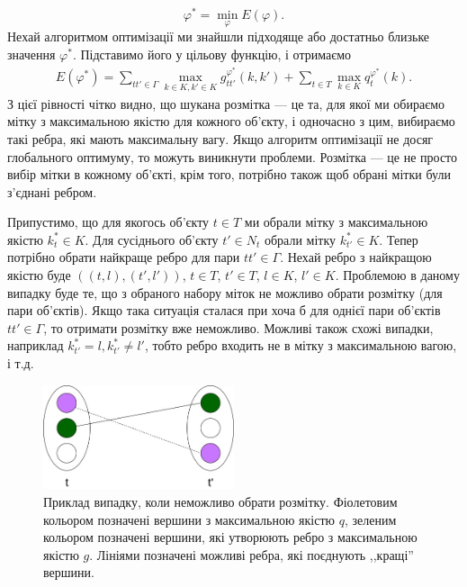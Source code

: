 \begin{equation*}
    \varphi^* = \min_{\varphi} E(\varphi).
\end{equation*}
Нехай алгоритмом оптимізації ми знайшли підходяще або достатньо близьке
значення $\varphi^*$. Підставимо його у цільову функцію, і отримаємо
\begin{equation*}
    \begin{aligned}
    E(\varphi^*) =
    \sum\limits_{tt'\in\Gamma}\max\limits_{k\in K, k'\in K}g^{\varphi^*}_{tt'}(k,k') + 
    \sum\limits_{t\in T}\max\limits_{k\in K}q^{\varphi^*}_t(k).
\end{aligned}
\end{equation*}
З цієї рівності чітко видно, що шукана розмітка --- це та, для якої ми обираємо мітку з
максимальною якістю для кожного об'єкту, і одночасно з цим, вибираємо такі ребра, які мають
максимальну вагу. Якщо алгоритм оптимізації не досяг глобального оптимуму, то 
можуть виникнути проблеми. Розмітка --- це не просто вибір мітки в кожному об'єкті, 
крім того, потрібно також щоб обрані мітки були з'єднані ребром. 

Припустимо, що
для якогось об'єкту $t\in T$ ми обрали мітку з максимальною якістю $k_t^*\in K$.
Для сусіднього об'єкту $t'\in N_t$ обрали мітку $k_{t'}^*\in K$. Тепер потрібно 
обрати найкраще ребро для пари $tt'\in\Gamma$. Нехай ребро з найкращою якістю
буде $((t,l),(t',l'))$, $t\in T$, $t'\in T$, $l\in K$, $l'\in K$. Проблемою в даному випадку
буде те, що з обраного набору міток не можливо обрати розмітку (для пари об'єктів).
Якщо така ситуація сталася при хоча б для однієї пари об'єктів $tt'\in\Gamma$, то 
отримати розмітку вже неможливо. Можливі також схожі випадки, наприклад 
$k_{t'}^*=l, k_{t'}^*\neq l'$, тобто ребро входить не в мітку з максимальною
вагою, і т.д.
\begin{figure}[h]
    \centering
    \includegraphics[width=0.5\textwidth]{images/multiple_choice.jpg}
    \caption{Приклад випадку, коли неможливо обрати розмітку. Фіолетовим кольором
    позначені вершини з максимальною якістю $q$, зеленим кольором позначені вершини, які
    утворюють ребро з максимальною якістю $g$. Лініями позначені можливі ребра,
    які поєднують ,,кращі'' вершини.}
    \label{fig:graph_example}
  \end{figure}

